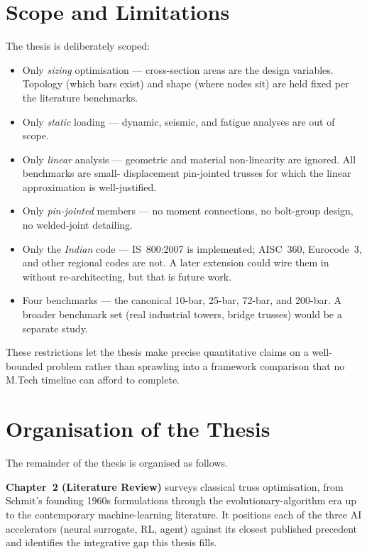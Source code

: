 \section{Scope and Limitations}
\label{sec:intro:scope}

The thesis is deliberately scoped:
\begin{itemize}
  \item Only \emph{sizing} optimisation — cross-section areas are
        the design variables. Topology (which bars exist) and shape
        (where nodes sit) are held fixed per the literature
        benchmarks.
  \item Only \emph{static} loading — dynamic, seismic, and fatigue
        analyses are out of scope.
  \item Only \emph{linear} analysis — geometric and material
        non-linearity are ignored. All benchmarks are small-
        displacement pin-jointed trusses for which the linear
        approximation is well-justified.
  \item Only \emph{pin-jointed} members — no moment connections,
        no bolt-group design, no welded-joint detailing.
  \item Only the \emph{Indian} code — IS~800:2007 is implemented;
        AISC~360, Eurocode~3, and other regional codes are not.
        A later extension could wire them in without re-architecting,
        but that is future work.
  \item Four benchmarks — the canonical 10-bar, 25-bar, 72-bar, and
        200-bar. A broader benchmark set (real industrial towers,
        bridge trusses) would be a separate study.
\end{itemize}

These restrictions let the thesis make precise quantitative claims
on a well-bounded problem rather than sprawling into a framework
comparison that no M.Tech timeline can afford to complete.

\section{Organisation of the Thesis}
\label{sec:intro:organisation}

The remainder of the thesis is organised as follows.

\textbf{Chapter~2 (Literature Review)} surveys classical truss
optimisation, from Schmit's founding 1960s formulations through the
evolutionary-algorithm era up to the contemporary machine-learning
literature. It positions each of the three AI accelerators (neural
surrogate, RL, agent) against its closest published precedent and
identifies the integrative gap this thesis fills.

